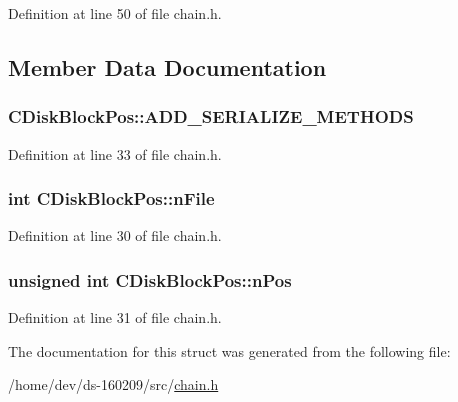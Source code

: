 Definition at line 50 of file chain.\+h.



\subsection{Member Data Documentation}
\hypertarget{struct_c_disk_block_pos_a958cd730b290bbb0153d514c56517590}{}
\subsubsection[{A\+D\+D\+\_\+\+S\+E\+R\+I\+A\+L\+I\+Z\+E\+\_\+\+M\+E\+T\+H\+O\+D\+S}]{\setlength{\rightskip}{0pt plus 5cm}C\+Disk\+Block\+Pos\+::\+A\+D\+D\+\_\+\+S\+E\+R\+I\+A\+L\+I\+Z\+E\+\_\+\+M\+E\+T\+H\+O\+D\+S}\label{struct_c_disk_block_pos_a958cd730b290bbb0153d514c56517590}


Definition at line 33 of file chain.\+h.

\hypertarget{struct_c_disk_block_pos_a09f30dab5c02fbdea8a17f9bcee5aac8}{}
\subsubsection[{n\+File}]{\setlength{\rightskip}{0pt plus 5cm}int C\+Disk\+Block\+Pos\+::n\+File}\label{struct_c_disk_block_pos_a09f30dab5c02fbdea8a17f9bcee5aac8}


Definition at line 30 of file chain.\+h.

\hypertarget{struct_c_disk_block_pos_a9b4b5e149b655ac5c22d05883b5bca0e}{}
\subsubsection[{n\+Pos}]{\setlength{\rightskip}{0pt plus 5cm}unsigned int C\+Disk\+Block\+Pos\+::n\+Pos}\label{struct_c_disk_block_pos_a9b4b5e149b655ac5c22d05883b5bca0e}


Definition at line 31 of file chain.\+h.



The documentation for this struct was generated from the following file\+:\begin{DoxyCompactItemize}
\item 
/home/dev/ds-\/160209/src/\hyperlink{chain_8h}{chain.\+h}\end{DoxyCompactItemize}
